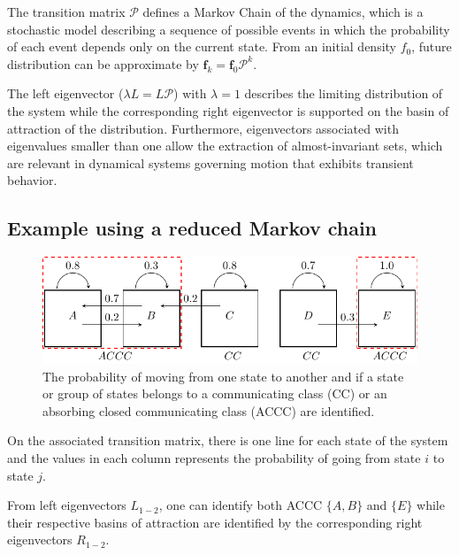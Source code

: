 \documentclass[final]{beamer}
\newcommand{\PF}{\mathcal{P}}
\begin{document}
\begin{frame}[t]
\begin{multicols}{3}
The transition matrix $\PF$ defines a Markov Chain of the dynamics, which is a stochastic model describing a sequence of possible events in which the probability of each event depends only on the current state. From an initial density $f_0$, future distribution can be approximate by $\mathbf{f}_k = \mathbf{f}_0 \PF^k$.

The left eigenvector ($\lambda L = L \PF$) with $\lambda = 1$ describes the limiting distribution of the system while the corresponding right eigenvector is supported on the basin of attraction of the distribution.  Furthermore, eigenvectors associated with eigenvalues smaller than one allow the extraction of almost-invariant sets, which are relevant in dynamical systems governing motion that exhibits transient behavior.

\subsection{Example using a reduced Markov chain}
\begin{figure}[!ht]
  \centering
  \includegraphics[width=0.8\columnwidth]{figures/fig01}
  \caption{The probability of moving from one state to another and if a state or group of states belongs to a communicating class (CC) or an absorbing closed communicating class (ACCC) are identified.}
  \label{fig:ccc}
\end{figure}
On the associated transition matrix, there is one line for each state of the system and the values in each column represents the probability of going from state $i$ to state $j$.  

\vspace{0.5cm}
\columnbreak
From left eigenvectors $L_{1-2}$, one can identify both ACCC $\lbrace A, B\rbrace$ and  $\lbrace E \rbrace$ while their respective basins of attraction are identified by the corresponding right eigenvectors $R_{1-2}$.


\end{multicols}
\end{frame}
\end{document}
